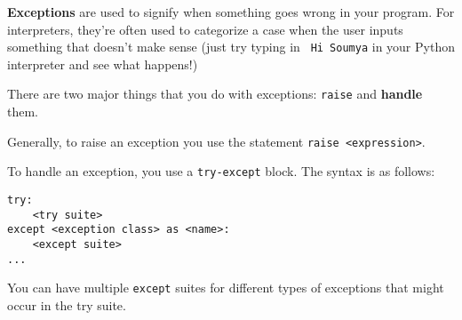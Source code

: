\textbf{Exceptions} are used to signify when something goes wrong
in your program. For interpreters, they're often used to categorize a case when
the user inputs something that doesn't make sense (just try typing in {\tt
Hi Soumya} in your Python interpreter and see what happens!)

There are two major things that you do with exceptions: {\tt raise}
and \textbf{handle} them.

Generally, to raise an exception you use the statement {\tt raise
<expression>}.

To handle an exception, you use a {\tt try-except} block. The syntax is as
follows:

\begin{lstlisting}
try:
    <try suite>
except <exception class> as <name>:
    <except suite>
...
\end{lstlisting}

You can have multiple {\tt except} suites for different types of exceptions that
might occur in the try suite.



